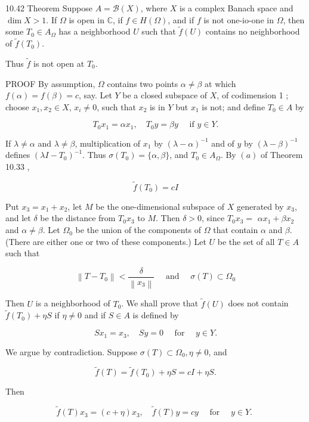 \documentclass[10pt]{article}
\begin{document}
10.42 Theorem Suppose $A=\mathscr{B}(X)$, where $X$ is a complex Banach space and $\operatorname{dim} X>1$. If $\Omega$ is open in $\mathbb{C}$, if $f \in H(\Omega)$, and if $f$ is not one-io-one in $\Omega$, then some $T_{0} \in A_{\Omega}$ has a neighborhood $U$ such that $\tilde{f}(U)$ contains no neighborhood of $\tilde{f}\left(T_{0}\right)$.

Thus $\tilde{f}$ is not open at $T_{0}$.

PROOF By assumption, $\Omega$ contains two points $\alpha \neq \beta$ at which $f(\alpha)=f(\beta)=c$, say. Let $Y$ be a closed subspace of $X$, of codimension 1 ; choose $x_{1}, x_{2} \in X$, $x_{i} \neq 0$, such that $x_{2}$ is in $Y$ but $x_{1}$ is not; and define $T_{0} \in A$ by

$$
T_{0} x_{1}=\alpha x_{1}, \quad T_{0} y=\beta y \quad \text { if } y \in Y .
$$

If $\lambda \neq \alpha$ and $\lambda \neq \beta$, multiplication of $x_{1}$ by $(\lambda-\alpha)^{-1}$ and of $y$ by $(\lambda-\beta)^{-1}$ defines $\left(\lambda I-T_{0}\right)^{-1}$. Thus $\sigma\left(T_{0}\right)=\{\alpha, \beta\}$, and $T_{0} \in A_{\Omega}$. By $(a)$ of Theorem 10.33 ,

$$
\tilde{f}\left(T_{0}\right)=c I
$$

Put $x_{3}=x_{1}+x_{2}$, let $M$ be the one-dimensional subspace of $X$ generated by $x_{3}$, and let $\delta$ be the distance from $T_{0} x_{3}$ to $M$. Then $\delta>0$, since $T_{0} x_{3}=$ $\alpha x_{1}+\beta x_{2}$ and $\alpha \neq \beta$. Let $\Omega_{0}$ be the union of the components of $\Omega$ that contain $\alpha$ and $\beta$. (There are either one or two of these components.) Let $U$ be the set of all $T \in A$ such that

$$
\left\|T-T_{0}\right\|<\frac{\delta}{\left\|x_{3}\right\|} \quad \text { and } \quad \sigma(T) \subset \Omega_{0}
$$

Then $U$ is a neighborhood of $T_{0}$. We shall prove that $\tilde{f}(U)$ does not contain $\tilde{f}\left(T_{0}\right)+\eta S$ if $\eta \neq 0$ and if $S \in A$ is defined by

$$
S x_{1}=x_{3}, \quad S y=0 \quad \text { for } \quad y \in Y .
$$

We argue by contradiction. Suppose $\sigma(T) \subset \Omega_{0}, \eta \neq 0$, and

$$
\tilde{f}(T)=\tilde{f}\left(T_{0}\right)+\eta S=c I+\eta S .
$$

Then

$$
\tilde{f}(T) x_{3}=(c+\eta) x_{3}, \quad \tilde{f}(T) y=c y \quad \text { for } \quad y \in Y \text {. }
$$
\end{document}
